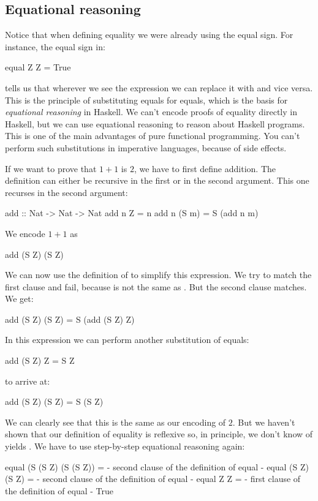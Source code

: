 \documentclass[DaoFP]{subfiles}
\begin{document}
\subsection{Equational reasoning}

Notice that when defining equality we were already using the equal sign. For instance, the equal sign in:
\begin{haskell}
equal Z Z = True
\end{haskell}
tells us that wherever we see the expression  we can replace it with  and vice versa. This is the principle of substituting equals for equals, which is the basis for \emph{equational reasoning} in Haskell. We can't encode proofs of equality directly in Haskell, but we can use equational reasoning to reason about Haskell programs. This is one of the main advantages of pure functional programming. You can't perform such substitutions in imperative languages, because of side effects.

If we want to prove that $1+1$ is $2$, we have to first define addition. The definition can either be recursive in the first or in the second argument. This one recurses in the second argument:
\begin{haskell}
add :: Nat -> Nat -> Nat
add n Z = n
add n (S m) = S (add n m)
\end{haskell}
We encode $1 + 1$ as 
\begin{haskell}
add (S Z) (S Z)
\end{haskell}
We can now use the definition of  to simplify this expression. We try to match the first clause and fail, because  is not the same as . But the second clause matches. We get:
\begin{haskell}
add (S Z) (S Z) = S (add (S Z) Z)
\end{haskell}
In this expression we can perform another substitution of equals:
\begin{haskell}
add (S Z) Z = S Z
\end{haskell}
to arrive at:
\begin{haskell}
add (S Z) (S Z) = S (S Z)
\end{haskell}
We can clearly see that this is the same as our encoding of $2$. But we haven't shown that our definition of equality is reflexive so, in principle, we don't know of  yields . We have to use step-by-step equational reasoning again:
\begin{haskell}
equal (S (S Z) (S (S Z)) =
{- second clause of the definition of equal -}
equal (S Z) (S Z) =
{- second clause of the definition of equal -}
equal Z Z =
{- first clause of the definition of equal -}
True
\end{haskell}
\end{document}
